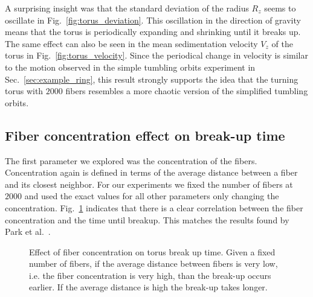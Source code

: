 A surprising insight was that the standard deviation of the radius $R_z$ seems to oscillate in Fig.~\ref{fig:torus_deviation}. This oscillation in the direction of gravity means that the torus is periodically expanding and shrinking until it breaks up. The same effect can also be seen in the mean sedimentation velocity $V_z$ of the torus in Fig.~\ref{fig:torus_velocity}. Since the periodical change in velocity is similar to the motion observed in the simple tumbling orbits experiment in Sec.~\ref{sec:example_ring},  this result strongly supports the idea that the turning torus with $2000$ fibers resembles a more chaotic version of the simplified tumbling orbits.

\subsection{Fiber concentration effect on break-up time}
\label{subsec:effect_concentration}

The first parameter we explored was the concentration of the fibers. Concentration again is defined in terms of the average distance between a fiber and its closest neighbor. For our experiments we fixed the number of fibers at $2000$ and used the exact values for all other parameters only changing the concentration. Fig.~\ref{fig:concentration_breakup} indicates that there is a clear correlation between the fiber concentration and the time until breakup. This matches the results found by Park et al.~\cite{Park2010}.

\begin{figure}[!htbp]
  \centering
  \caption[Effect of fiber concentration on torus break up time.]{Effect of fiber concentration on torus break up time. Given a fixed number of fibers, if the average distance between fibers is very low, i.e. the fiber concentration is very high, than the break-up occurs earlier. If the average distance is high the break-up takes longer.}
  \label{fig:concentration_breakup}
\end{figure}

